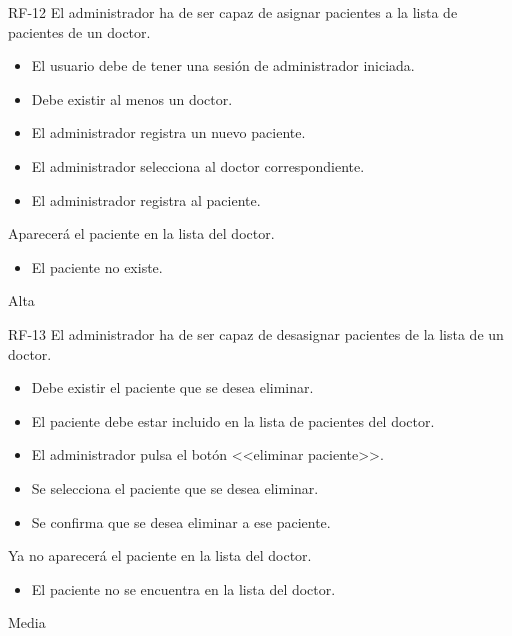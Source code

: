 {RF-12}
{El administrador ha de ser capaz de asignar pacientes a la lista de pacientes de un doctor.}
{	\begin{itemize}
	\def\labelenumi{\arabic{enumi}.}
	\tightlist
	\item El usuario debe de tener una sesión de administrador iniciada.
	\item Debe existir al menos un doctor.
	\end{itemize}}
{
	\begin{itemize}
	\def\labelenumi{\arabic{enumi}.}
	\tightlist
    \item El administrador registra un nuevo paciente.
    \item El administrador selecciona al doctor correspondiente.
    \item El administrador registra al paciente.
    
    \end{itemize}
}
{Aparecerá el paciente en la lista del doctor.}
{	\begin{itemize}
	\def\labelenumi{\arabic{enumi}.}
	\tightlist
    \item El paciente no existe.
    
    \end{itemize}}
{Alta}

{RF-13}
{El administrador ha de ser capaz de desasignar pacientes de la lista de un doctor.}
{	\begin{itemize}
	\def\labelenumi{\arabic{enumi}.}
	\tightlist
	\item Debe existir el paciente que se desea eliminar.
	\item El paciente debe estar incluido en la lista de pacientes del doctor.
	\end{itemize}}
{
	\begin{itemize}
	\def\labelenumi{\arabic{enumi}.}
	\tightlist
    \item El administrador pulsa el botón <<eliminar paciente>>.
    \item Se selecciona el paciente que se desea eliminar.
	\item Se confirma que se desea eliminar a ese paciente.
    \end{itemize}
}
{Ya no aparecerá el paciente en la lista del doctor.}
{	\begin{itemize}
	\def\labelenumi{\arabic{enumi}.}
	\tightlist
    \item El paciente no se encuentra en la lista del doctor.
    \end{itemize}}
{Media}

